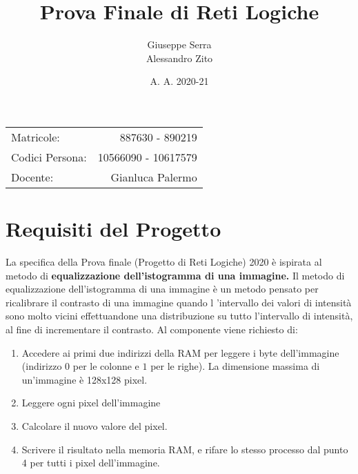 \documentclass{article}
\title{Prova Finale di Reti Logiche} %
\author{Giuseppe Serra \\ Alessandro Zito} %
\date{A. A. 2020-21}
\begin{document}
\maketitle %
\begin{center}
\begin{tabular}{l r}
Matricole: & 887630 - 890219\\ %
Codici Persona: & 10566090 - 10617579\\
Docente: & Gianluca Palermo %
\end{tabular}
\end{center}

\newpage

\tableofcontents

\newpage




\section{Requisiti del Progetto}


La specifica della Prova finale (Progetto di Reti Logiche) 2020 è ispirata al metodo di \textbf{equalizzazione dell’istogramma di una immagine.}
Il metodo di equalizzazione dell’istogramma di una immagine è un metodo pensato per ricalibrare il contrasto di una immagine quando l ’intervallo dei valori di intensità sono molto vicini effettuandone una distribuzione su tutto l’intervallo di intensità, al fine di incrementare il contrasto. Al componente viene richiesto di:
\begin{enumerate}
\item Accedere ai primi due indirizzi della RAM per leggere i byte dell'immagine (indirizzo $0$ per le colonne e $1$ per le righe). La dimensione massima di un'immagine è 128x128 pixel.
\item Leggere ogni pixel dell'immagine
\item Calcolare il nuovo valore del pixel.
\item Scrivere il risultato nella memoria RAM, e rifare lo stesso processo dal punto 4 per tutti i pixel dell'immagine.
\end{enumerate}
\end{document}
